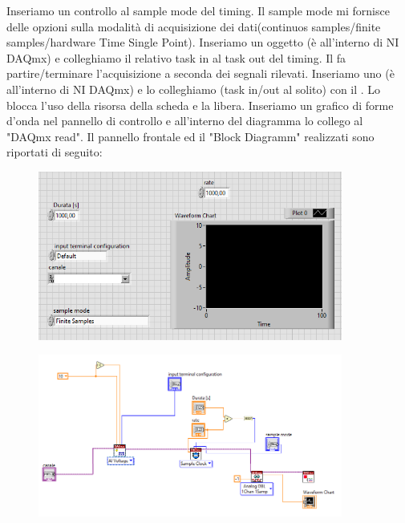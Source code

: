 Inseriamo un controllo al sample mode del timing. Il sample mode mi fornisce delle opzioni sulla modalità di acquisizione dei dati(continuos samples/finite samples/hardware Time Single Point).
Inseriamo un oggetto  (è all'interno di NI DAQmx) e colleghiamo il relativo task in al task out del timing. Il   fa partire/terminare l'acquisizione a seconda dei segnali rilevati.
Inseriamo uno  (è all'interno di NI DAQmx) e lo colleghiamo (task in/out al solito) con il . Lo  blocca l'uso della risorsa della scheda e la libera.
Inseriamo un grafico di forme d'onda nel pannello di controllo e all'interno del diagramma lo collego al "DAQmx read".
Il pannello frontale ed il "Block Diagramm" realizzati sono riportati di seguito:
\begin{figure}[H]
\caption{}
    \includegraphics[width=10cm]{settimana_1/immagini/MXACQUISPANEL.png}
    \centering
\end{figure}
\begin{figure}[H]
\caption{}
    \includegraphics[width=10cm]{settimana_1/immagini/MXACQUISDIAG.png}
    \centering
\end{figure}





